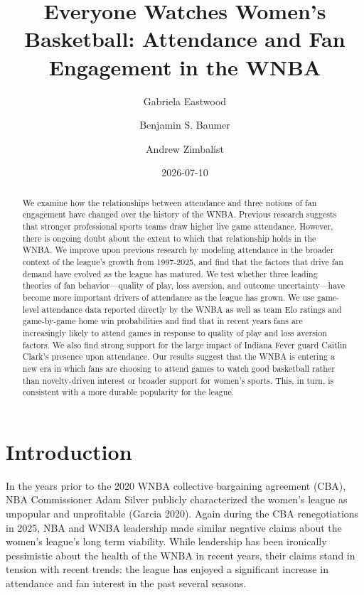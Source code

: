 \documentclass[
  letterpaper,
  DIV=11,
  numbers=noendperiod]{scrartcl}
\title{Everyone Watches Women's Basketball: Attendance and Fan
Engagement in the WNBA}
\author{Gabriela Eastwood \and Benjamin S. Baumer \and Andrew Zimbalist}
\date{2026-07-10}
\begin{document}
\maketitle
\begin{abstract}
We examine how the relationships between attendance and three notions of
fan engagement have changed over the history of the WNBA. Previous
research suggests that stronger professional sports teams draw higher
live game attendance. However, there is ongoing doubt about the extent
to which that relationship holds in the WNBA. We improve upon previous
research by modeling attendance in the broader context of the league's
growth from 1997-2025, and find that the factors that drive fan demand
have evolved as the league has matured. We test whether three leading
theories of fan behavior---quality of play, loss aversion, and outcome
uncertainty---have become more important drivers of attendance as the
league has grown. We use game-level attendance data reported directly by
the WNBA as well as team Elo ratings and game-by-game home win
probabilities and find that in recent years fans are increasingly likely
to attend games in response to quality of play and loss aversion
factors. We also find strong support for the large impact of Indiana
Fever guard Caitlin Clark's presence upon attendance. Our results
suggest that the WNBA is entering a new era in which fans are choosing
to attend games to watch good basketball rather than novelty-driven
interest or broader support for women's sports. This, in turn, is
consistent with a more durable popularity for the league.
\end{abstract}


\section{Introduction}\label{sec-intro}

In the years prior to the 2020 WNBA collective bargaining agreement
(CBA), NBA Commissioner Adam Silver publicly characterized the women's
league as unpopular and unprofitable (Garcia 2020). Again during the CBA
renegotiations in 2025, NBA and WNBA leadership made similar negative
claims about the women's league's long term viability. While leadership
has been ironically pessimistic about the health of the WNBA in recent
years, their claims stand in tension with recent trends: the league has
enjoyed a significant increase in attendance and fan interest in the
past several seasons.
\end{document}
